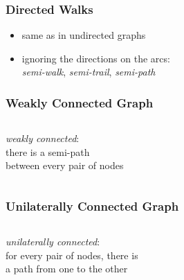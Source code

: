 \documentclass[dvipsnames]{beamer}
\begin{document}
\begin{frame}
  \frametitle{Directed Walks}

  \begin{itemize}
    \item same as in undirected graphs
    \item ignoring the directions on the arcs:\\
      \emph{semi-walk}, \emph{semi-trail}, \emph{semi-path}
  \end{itemize}
\end{frame}

\begin{frame}
  \frametitle{Weakly Connected Graph}

  \begin{columns}
    \begin{definition}
      \emph{weakly connected}:\\
      there is a semi-path\\
      between every pair of nodes
    \end{definition}

    \begin{example}
      \begin{center}
      \end{center}
    \end{example}
  \end{columns}
\end{frame}

\begin{frame}
  \frametitle{Unilaterally Connected Graph}

  \begin{columns}
    \begin{definition}
      \emph{unilaterally connected}:\\
      for every pair of nodes, there is\\
      a path from one to the other
    \end{definition}

    \begin{example}
      \begin{center}
      \end{center}
    \end{example}
  \end{columns}
\end{frame}
\end{document}

